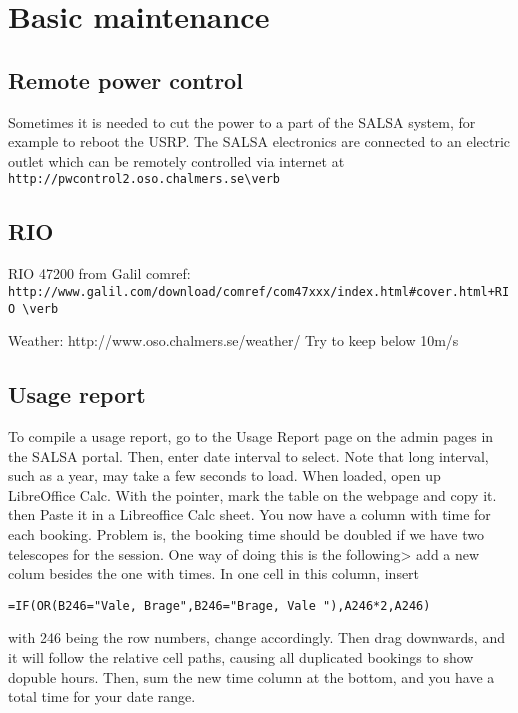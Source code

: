 \chapter{Basic maintenance}

\section{Remote power control}
Sometimes it is needed to cut the power to a part of the SALSA system,
for example to reboot the USRP. The SALSA electronics are connected to an electric outlet which
can be remotely controlled via internet at 
\verb! http://pwcontrol2.oso.chalmers.se\verb!

\section{RIO}
RIO 47200 from Galil
comref: \verb! http://www.galil.com/download/comref/com47xxx/index.html#cover.html+RIO \verb!

Weather:
http://www.oso.chalmers.se/weather/
Try to keep below 10m/s

\section{Usage report}
To compile a usage report, go to the Usage Report page on the admin pages in the
SALSA portal. Then, enter date interval to select. Note that long interval, such as a year,
may take a few seconds to load. When loaded, open up LibreOffice Calc. 
With the pointer, mark the table on the webpage and copy it. then
Paste it in a Libreoffice Calc sheet. 
You now have a column with time for each booking. Problem is, the booking
time should be doubled if we have two telescopes for the session. One 
way of doing this is the following> add a new colum besides the one with times.
In one cell in this column, insert
\begin{verbatim}
=IF(OR(B246="Vale, Brage",B246="Brage, Vale "),A246*2,A246)
\end{verbatim}
with 246 being the row numbers, change accordingly.
Then drag downwards, and it will follow the relative cell paths,
causing all duplicated bookings to show dopuble hours. Then, sum
the new time column at the bottom, and you have a total time
for your date range.

